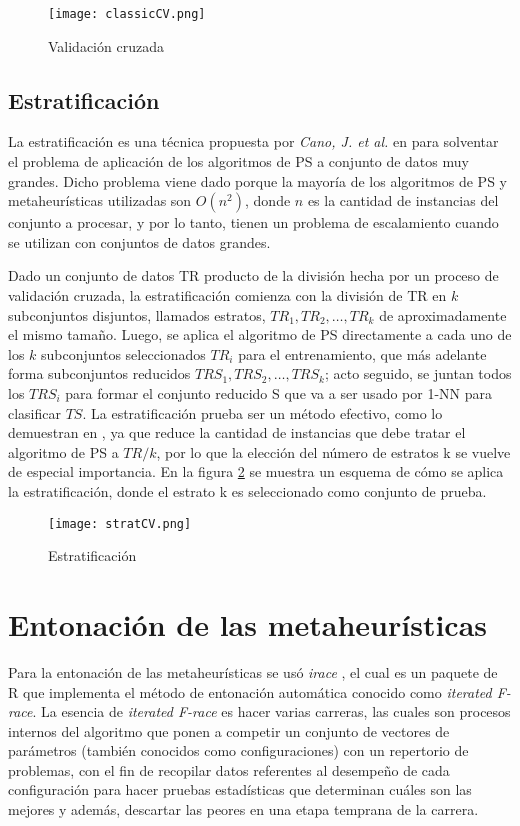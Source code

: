 \begin{figure}[h!]
\centering
\texttt{[image: classicCV.png]}
\caption[Validación cruzada]{Validación cruzada}
\label{crossval}
\end{figure}

\subsection{Estratificación}

La estratificación es una técnica propuesta por \emph{Cano, J. et al.} en \cite{cano2005stratification} para solventar el problema de aplicación de los algoritmos de PS a conjunto de datos muy grandes. Dicho problema viene dado porque la mayoría de los algoritmos de PS y metaheurísticas utilizadas son $O(n^2)$, donde $n$ es la cantidad de instancias del conjunto a procesar, y por lo tanto, tienen un problema de escalamiento cuando se utilizan con conjuntos de datos grandes.

Dado un conjunto de datos TR producto de la división hecha por un proceso de validación cruzada, la estratificación comienza con la división de TR en $k$ subconjuntos disjuntos, llamados estratos, $TR_1,TR_2,\dots,TR_k$ de aproximadamente el mismo tamaño. Luego, se aplica el algoritmo de PS directamente a cada uno de los $k$ subconjuntos seleccionados $TR_i$ para el entrenamiento, que más adelante forma subconjuntos reducidos $TRS_1,TRS_2,\dots,TRS_k$; acto seguido, se juntan todos los $TRS_i$ para formar el conjunto reducido S que va a ser usado por 1-NN para clasificar $TS$. La estratificación prueba ser un método efectivo, como lo demuestran en \cite{cano2005stratification}, ya que reduce la cantidad de instancias que debe tratar el algoritmo de PS a $TR/k$, por lo que la elección del número de estratos k se vuelve de especial importancia. En la figura \ref{strat} se muestra un esquema de cómo se aplica la estratificación, donde el estrato k es seleccionado como conjunto de prueba.

\begin{figure}[h!]
\centering
\texttt{[image: stratCV.png]}
\caption[Estratificación]{Estratificación}
\label{strat}
\end{figure}

\section{Entonación de las metaheurísticas}

Para la entonación de las metaheurísticas se usó \emph{irace} \cite{lopez2016irace}, el cual es un paquete de R que implementa el método de entonación automática conocido como \emph{iterated F-race}. La esencia de \emph{iterated F-race}
es hacer varias carreras, las cuales son procesos internos del algoritmo que ponen a competir un conjunto de vectores de parámetros (también conocidos como configuraciones) con un repertorio de problemas, con el fin de recopilar datos referentes al desempeño de cada configuración para hacer pruebas estadísticas que determinan cuáles son las mejores y además, descartar las peores en una etapa temprana de la carrera. 


